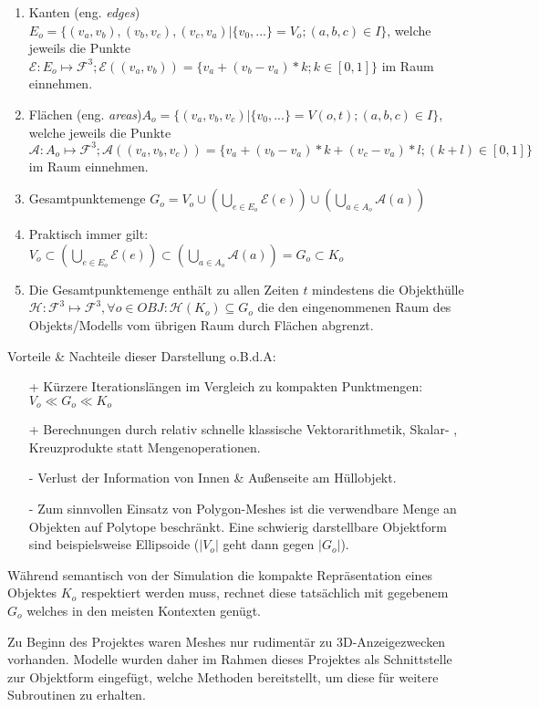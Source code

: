 \begin{enumerate}
\item Kanten (eng. \textit{edges}) $E_o = \{(v_a, v_b), (v_b, v_c),(v_c, v_a) | \{v_0, ...\} = V_o;(a, b, c) \in I\} $, welche jeweils die Punkte $\mathcal{E}:E_o\mapsto\mathcal{F}^3; \mathcal{E}((v_a, v_b)) = \{v_a + (v_b-v_a)* k; k \in [0,1]\} $ im Raum einnehmen.
\item Flächen (eng. \textit{areas})$ A_o = \{(v_a, v_b, v_c) | \{v_0, ... \} = V(o, t); (a, b, c) \in I\} $,\\
welche jeweils die Punkte $\mathcal{A}:A_o\mapsto\mathcal{F}^3; \mathcal{A}((v_a, v_b, v_c)) = \{v_a + (v_b-v_a)* k + (v_c-v_a)*l; (k+l) \in [0,1]\} $ im Raum einnehmen.
\item Gesamtpunktemenge $G_o = V_o \cup (\bigcup_{e\in E_o} \mathcal{E}(e)) \cup (\bigcup_{a\in A_o} \mathcal{A}(a)) $
\item Praktisch immer gilt: $V_o \subset (\bigcup_{e\in E_o} \mathcal{E}(e)) \subset (\bigcup_{a\in A_o} \mathcal{A}(a)) = G_o \subset K_o$
\item Die Gesamtpunktemenge enthält zu allen Zeiten $t$ mindestens die Objekthülle $\mathcal{H}: \mathcal{F}^3 \mapsto \mathcal{F}^3, \forall o\in OBJ: \mathcal{H}(K_o) \subseteq G_o$ die den eingenommenen Raum des Objekts/Modells vom übrigen Raum durch Flächen abgrenzt.
\end{enumerate}

Vorteile \& Nachteile dieser Darstellung o.B.d.A:
\begin{itemize}
\item [+]Kürzere Iterationslängen im Vergleich zu kompakten Punktmengen: $V_o \ll G_o \ll K_o$
\item [+]Berechnungen durch relativ schnelle klassische Vektorarithmetik, Skalar- , Kreuzprodukte statt Mengenoperationen.
\item [-]Verlust der Information von Innen \& Außenseite am Hüllobjekt.
\item [-]Zum sinnvollen Einsatz von Polygon-Meshes ist die verwendbare Menge an Objekten auf Polytope beschränkt. Eine schwierig darstellbare Objektform sind beispielsweise Ellipsoide ($|V_o|$ geht dann gegen $|G_o|$).
\end{itemize}

Während semantisch von der Simulation die kompakte Repräsentation eines Objektes $K_o$ respektiert werden muss, rechnet diese tatsächlich mit gegebenem $G_o$ welches in den meisten Kontexten genügt.

Zu Beginn des Projektes waren Meshes nur rudimentär zu 3D-Anzeigezwecken vorhanden. Modelle wurden daher im Rahmen dieses Projektes als Schnittstelle zur Objektform eingefügt, welche Methoden bereitstellt, um diese für weitere Subroutinen zu erhalten.

